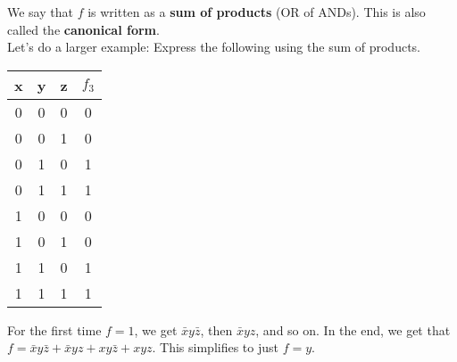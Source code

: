 \documentclass[]{article}
\begin{document}
We say that $f$ is written as a \textbf{sum of products} (OR of ANDs). This is also called the \textbf{canonical form}.\\

Let's do a larger example: Express the following using the sum of products. 

\begin{center}
	\begin{tabular}{|c|c|c|c|}
		x & y & z & $f_3$ \\\hline
		0 & 0 & 0 & 0\\
		0 & 0 & 1 & 0\\
		0 & 1 & 0 & 1\\
		0 & 1 & 1 & 1\\
		1 & 0 & 0 & 0\\
		1 & 0 & 1 & 0\\
		1 & 1 & 0 & 1\\
		1 & 1 & 1 & 1\\
	\end{tabular}
	\bigbreak
\end{center}

For the first time $f=1$, we get $\bar{x}y\bar{z}$, then $\bar{x}yz$, and so on. In the end, we get that $f = \bar{x}y\bar{z} + \bar{x}yz + xy\bar{z} + xyz$. This simplifies to just $f=y$. \\
\end{document}

